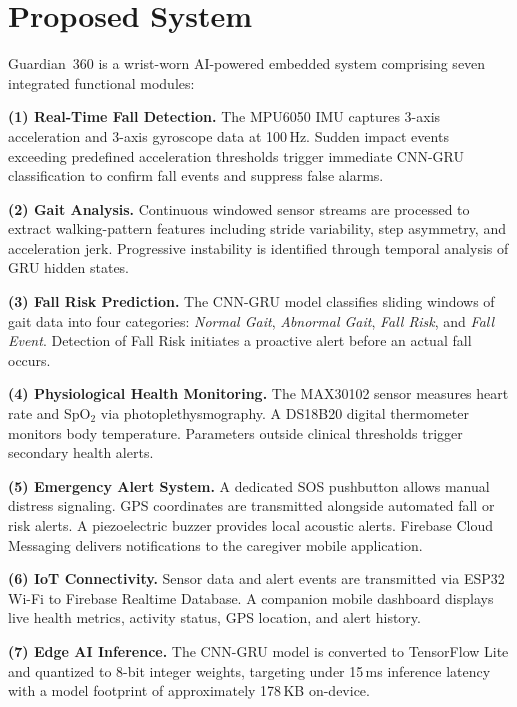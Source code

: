 \documentclass[conference]{IEEEtran}
\begin{document}
\section{Proposed System}
\label{sec:proposed}

Guardian~360 is a wrist-worn AI-powered embedded system comprising seven
integrated functional modules:

\textbf{(1) Real-Time Fall Detection.} The MPU6050 IMU captures 3-axis
acceleration and 3-axis gyroscope data at 100\,Hz. Sudden impact events
exceeding predefined acceleration thresholds trigger immediate CNN-GRU
classification to confirm fall events and suppress false alarms.

\textbf{(2) Gait Analysis.} Continuous windowed sensor streams are processed
to extract walking-pattern features including stride variability, step
asymmetry, and acceleration jerk. Progressive instability is identified
through temporal analysis of GRU hidden states.

\textbf{(3) Fall Risk Prediction.} The CNN-GRU model classifies sliding
windows of gait data into four categories: \textit{Normal Gait},
\textit{Abnormal Gait}, \textit{Fall Risk}, and \textit{Fall Event}.
Detection of Fall Risk initiates a proactive alert before an actual fall
occurs.

\textbf{(4) Physiological Health Monitoring.} The MAX30102 sensor measures
heart rate and SpO$_2$ via photoplethysmography. A DS18B20 digital
thermometer monitors body temperature. Parameters outside clinical
thresholds trigger secondary health alerts.

\textbf{(5) Emergency Alert System.} A dedicated SOS pushbutton allows
manual distress signaling. GPS coordinates are transmitted alongside
automated fall or risk alerts. A piezoelectric buzzer provides local
acoustic alerts. Firebase Cloud Messaging delivers notifications to the
caregiver mobile application.

\textbf{(6) IoT Connectivity.} Sensor data and alert events are transmitted
via ESP32 Wi-Fi to Firebase Realtime Database. A companion mobile dashboard
displays live health metrics, activity status, GPS location, and alert
history.

\textbf{(7) Edge AI Inference.} The CNN-GRU model is converted to
TensorFlow Lite and quantized to 8-bit integer weights, targeting under
15\,ms inference latency with a model footprint of approximately 178\,KB
on-device.
\end{document}
